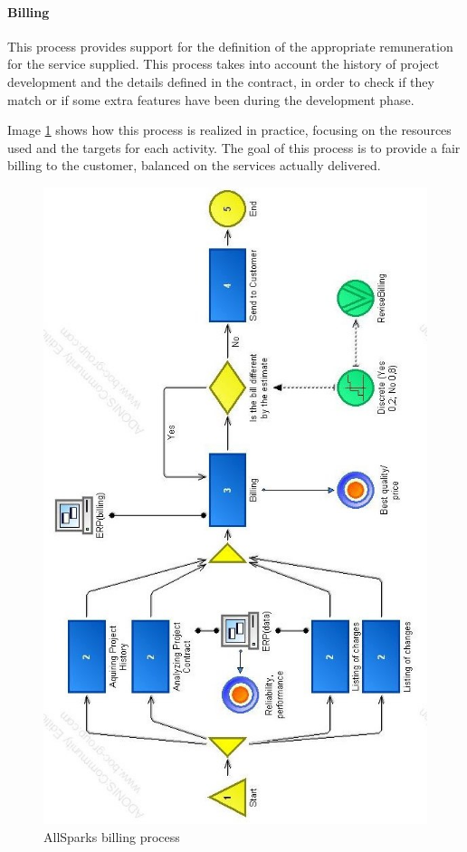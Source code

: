 \paragraph{Billing}
This process provides support for the definition of the appropriate
remuneration for the service supplied.
This process takes into account the history of project development and the
details defined in the contract, in order to check if they match or if some
extra features have been during the development phase.

Image \ref{2img:billing} shows how this process is realized in practice,
focusing on the resources used and the targets for each activity.
The goal of this process is to provide a fair billing to the customer,
balanced on the services actually delivered.

\begin{figure}[ht!]
\begin{centering}
\includegraphics[scale=0.50]{assign2/adonis/imgs/billing.jpg}
\caption{AllSparks billing process}
\label{2img:billing}
\end{centering}
\end{figure}
